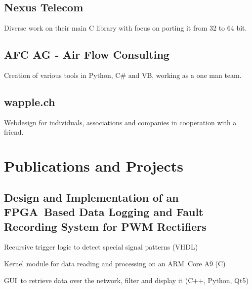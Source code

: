 \documentclass[]{resume}
\begin{document}
\begin{timeline}
\subsection{Nexus Telecom}
Diverse work on their main C library with focus on porting it from 32 to 64 bit.
\sectionsep

\subsection{AFC AG - Air Flow Consulting}
Creation of various tools in Python, C\# and VB, working as a one man team.
\sectionsep

\subsection{wapple.ch}
Webdesign for individuals, associations and companies in cooperation with a friend.
\sectionsep


\section{Publications and Projects}

\subsection{Design and Implementation of an FPGA Based Data Logging and Fault Recording System for PWM Rectifiers}
\vspace{\topsep} %
\begin{tightemize}
\item Recursive trigger logic to detect special signal patterns (VHDL)
\item Kernel module for data reading and processing on an ARM Core A9 (C)
\item GUI to retrieve data over the network, filter and display it (C++, Python, Qt5)
\end{tightemize}
\sectionsep



\end{timeline}
\end{document}
